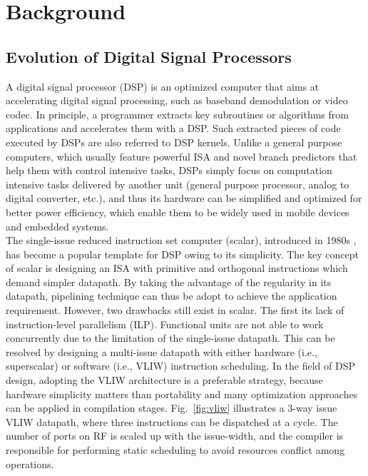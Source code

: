 \chapter{Background}
    \section{Evolution of Digital Signal Processors}
        A digital signal processor (DSP) is an optimized computer that aims at accelerating digital signal processing, such as baseband demodulation or video codec.
        In principle, a programmer extracts key subroutines or algorithms from applications and accelerates them with a DSP.
        Such extracted pieces of code executed by DSPs are also referred to DSP kernels.
        Unlike a general purpose computers, which usually feature powerful ISA and novel branch predictors that help them with control intensive tasks,
        DSPs simply focus on computation intensive tasks delivered by another unit (general purpose processor, analog to digital converter, etc.), 
        and thus its hardware can be simplified and optimized for better power efficiency, which enable them to be widely used in mobile devices and embedded systems.
        \\\indent
        The single-issue reduced instruction set computer (scalar), introduced in 1980s \cite{risc}, has become a popular template for DSP owing to its simplicity.
        The key concept of scalar is designing an ISA with primitive and orthogonal instructions which demand simpler datapath.
        By taking the advantage of the regularity in its datapath, pipelining technique can thus be adopt to achieve the application requirement.
        However, two drawbacks still exist in scalar. 
        The first its lack of instruction-level parallelism (ILP). 
        Functional units are not able to work concurrently due to the limitation of the single-issue datapath.
        This can be resolved by designing a multi-issue datapath with either hardware (i.e., superscalar) or software (i.e., VLIW) instruction scheduling.
        In the field of DSP design, adopting the VLIW architecture is a preferable strategy, 
        because hardware simplicity matters than portability and many optimization approaches can be applied in compilation stages. 
        Fig.~\ref{fig:vliw} illustrates a 3-way issue VLIW datapath, where three instructions can be dispatched at a cycle.
        The number of ports on RF is scaled up with the issue-width, and the compiler is responsible for performing static scheduling to avoid resources conflict among operations.
